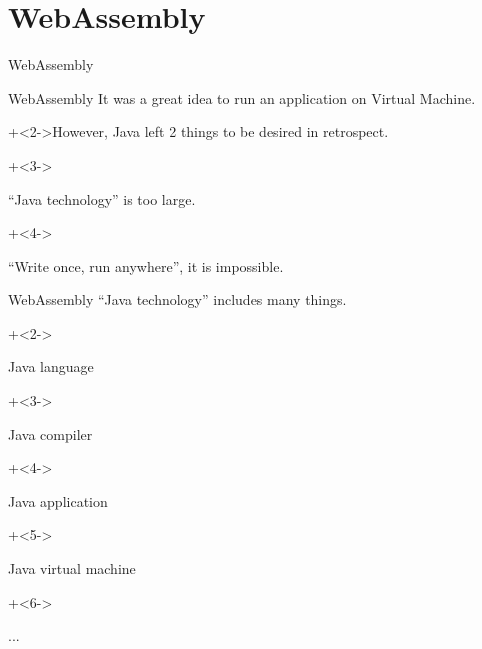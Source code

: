 %
%

\section{WebAssembly}


\begin{frame}{}{}
    {\Huge WebAssembly}
\end{frame}


\begin{frame}{WebAssembly}{}
    It was a great idea to run an application on Virtual Machine.
    \vspace{4ex}

    \onslide+<2->{However, Java left 2 things to be desired in retrospect.}
    \vspace{4ex}

    \begin{itemize}
        \onslide+<3->{\item ``Java technology'' is too large.}
        \onslide+<4->{\item ``Write once, run anywhere'', it is impossible.}
    \end{itemize}
\end{frame}


\begin{frame}{WebAssembly}{}
    ``Java technology'' includes many things.
    \vspace{4ex}

    \begin{itemize}
        \onslide+<2->{\item Java language}
        \onslide+<3->{\item Java compiler}
        \onslide+<4->{\item Java application}
        \onslide+<5->{\item Java virtual machine}
        \onslide+<6->{\item ...}
    \end{itemize}
\end{frame}


